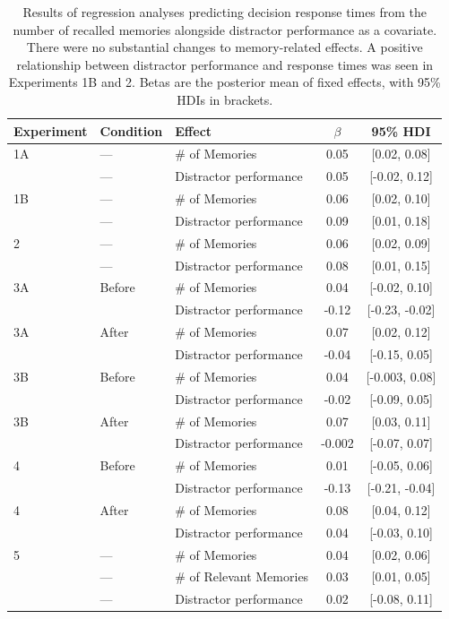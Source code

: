 \documentclass[10pt,letterpaper]{article}
\begin{document}
\clearpage
\begin{table}[h!]
\centering
\footnotesize
\begin{tabular}{lllcc}
\hline
Experiment & Condition & Effect & $\beta$ & 95\% HDI \\
\hline
1A & --- & \# of Memories & 0.05 & [0.02, 0.08] \\
 & --- & Distractor performance & 0.05 & [-0.02, 0.12] \\
\hline
1B & --- & \# of Memories & 0.06 & [0.02, 0.10] \\
& --- & Distractor performance & 0.09 & [0.01, 0.18] \\
\hline
2 & --- & \# of Memories & 0.06 & [0.02, 0.09] \\
& --- & Distractor performance & 0.08 & [0.01, 0.15] \\
\hline
3A & Before & \# of Memories & 0.04 & [-0.02, 0.10] \\
&  & Distractor performance & -0.12 & [-0.23, -0.02] \\
\hline
3A & After & \# of Memories & 0.07 & [0.02, 0.12] \\
&  & Distractor performance & -0.04 & [-0.15, 0.05] \\
\hline
3B & Before & \# of Memories & 0.04 & [-0.003, 0.08] \\
&  & Distractor performance & -0.02 & [-0.09, 0.05] \\
\hline
3B & After & \# of Memories & 0.07 & [0.03, 0.11] \\
&  & Distractor performance & -0.002 & [-0.07, 0.07] \\
\hline
4 & Before & \# of Memories & 0.01 & [-0.05, 0.06] \\
&  & Distractor performance & -0.13 & [-0.21, -0.04] \\
\hline
4 & After & \# of Memories & 0.08 & [0.04, 0.12] \\
&  & Distractor performance & 0.04 & [-0.03, 0.10] \\
\hline
5 & --- & \# of Memories & 0.04 & [0.02, 0.06] \\
& --- & \# of Relevant Memories & 0.03 & [0.01, 0.05] \\
& --- & Distractor performance & 0.02 & [-0.08, 0.11] \\
\hline
\end{tabular}
\caption{Results of regression analyses predicting decision response times from the number of recalled memories alongside distractor performance as a covariate. There were no substantial changes to memory-related effects. A positive relationship between distractor performance and response times was seen in Experiments 1B and 2. Betas are the posterior mean of fixed effects, with 95\% HDIs in brackets.}
\label{tab:memory_distractor_effects}
\end{table}
\end{document}
